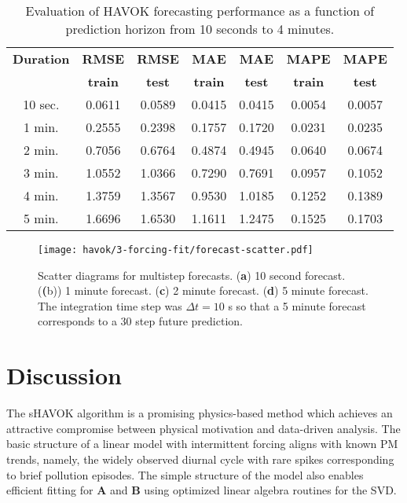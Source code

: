 \begin{table}[h]
  \caption{Evaluation of HAVOK forecasting performance as a function of
    prediction horizon from 10 seconds to 4 minutes. \vspace{0.15cm}}
  \label{tab:havok-forecasting-results}
  \centering
  \begin{tabular}{ccccccc} \hline
    \textbf{Duration} & \textbf{RMSE}  & \textbf{RMSE} & \textbf{MAE}   & \textbf{MAE}  & \textbf{MAPE}  & \textbf{MAPE} \\
                      & \textbf{train} & \textbf{test} & \textbf{train} & \textbf{test} & \textbf{train} & \textbf{test} \\\hline
    10 sec.	  & 0.0611 & 0.0589 & 0.0415 & 0.0415 & 0.0054 & 0.0057 \\
    1 min.	  & 0.2555 & 0.2398 & 0.1757 & 0.1720 & 0.0231 & 0.0235 \\
    2 min.	  & 0.7056 & 0.6764 & 0.4874 & 0.4945 & 0.0640 & 0.0674 \\
    3 min.	  & 1.0552 & 1.0366 & 0.7290 & 0.7691 & 0.0957 & 0.1052 \\
    4 min.	  & 1.3759 & 1.3567 & 0.9530 & 1.0185 & 0.1252 & 0.1389 \\
    5 min. 	  & 1.6696 & 1.6530 & 1.1611 & 1.2475 & 0.1525 & 0.1703
  \end{tabular}
\end{table}





\begin{figure}[h]
  \centering
  \texttt{[image: havok/3-forcing-fit/forecast-scatter.pdf]}
  \caption{Scatter diagrams for multistep forecasts. (\textbf{a}) 10 second
    forecast. (\textbf(b)) 1 minute forecast. (\textbf{c}) 2 minute forecast.
    (\textbf{d}) 5 minute forecast. The integration time step was $\Delta t =
    10$ s so that a 5 minute forecast corresponds to a 30 step future prediction.}
  \label{fig:forecasting-scatter}
\end{figure}

\section{Discussion}

The sHAVOK algorithm is a promising physics-based method which achieves an
attractive compromise between physical motivation and data-driven analysis.
The basic structure of a linear model with intermittent
forcing aligns with known PM trends, namely, the widely observed diurnal cycle
with rare spikes corresponding to brief pollution episodes. The simple structure
of the model also enables efficient fitting for $\mathbf{A}$ and $\mathbf{B}$
using optimized linear algebra routines for the SVD.

